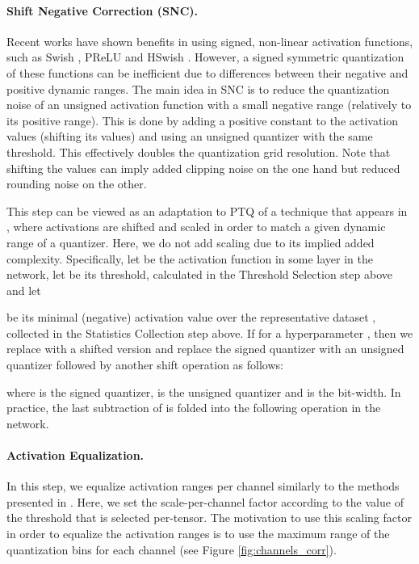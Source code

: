 \documentclass{article}
\begin{document}
\paragraph{Shift Negative Correction (SNC).}  
Recent works have shown benefits in using signed, non-linear activation functions, such as Swish \cite{ramachandran2017searching}, PReLU and HSwish \cite{howard2019searching}. However, a signed symmetric quantization of these functions can be inefficient due to differences between their negative and positive dynamic ranges.
The main idea in SNC is to reduce the quantization noise of an unsigned activation function with a small negative range (relatively to its positive range). 
This is done by adding a positive constant to the activation values (shifting its values) and using an unsigned quantizer with the same threshold. This effectively doubles the quantization grid resolution.
Note that shifting the values can imply added clipping noise on the one hand but reduced rounding noise on the other.

This step can be viewed as an adaptation to PTQ of a technique that appears in \cite{bhalgat2020lsq+}, where activations are shifted and scaled in order to match a given dynamic range of a quantizer. Here, we do not add scaling due to its implied added complexity.
Specifically, let  be the activation function in some layer  in the network, let  be its threshold, calculated in the Threshold Selection step above and let
 
be its minimal (negative) activation value over the representative dataset , collected in the Statistics Collection step above.
If  for a hyperparameter , then we replace  with a shifted version  and replace the signed quantizer with an unsigned quantizer followed by another shift operation as follows:

where  is the signed quantizer,  is the unsigned quantizer and  is the bit-width.
In practice, the last subtraction of  is folded into the following operation in the network.




\paragraph{Activation Equalization.} 
In this step, we equalize activation ranges per channel similarly to the methods presented in \cite{nagel2019data,meller2019same}. 
Here, we set the scale-per-channel factor according to the value of the threshold that is selected per-tensor. The motivation to use this scaling factor in order to equalize the activation ranges is to use the maximum range of the quantization bins for each channel (see Figure \ref{fig:channels_corr}).
\end{document}
